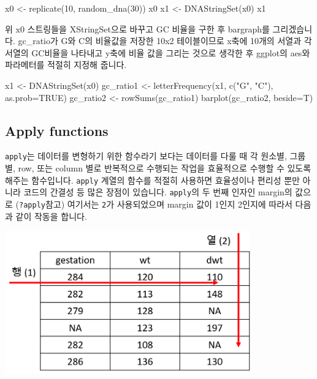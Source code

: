 \documentclass[
]{book}
\newenvironment{Shaded}{\begin{snugshade}}{\end{snugshade}}
\newcommand{\AttributeTok}[1]{\textcolor[rgb]{0.77,0.63,0.00}{#1}}
\newcommand{\ConstantTok}[1]{\textcolor[rgb]{0.00,0.00,0.00}{#1}}
\newcommand{\DecValTok}[1]{\textcolor[rgb]{0.00,0.00,0.81}{#1}}
\newcommand{\FunctionTok}[1]{\textcolor[rgb]{0.00,0.00,0.00}{#1}}
\newcommand{\NormalTok}[1]{#1}
\newcommand{\OtherTok}[1]{\textcolor[rgb]{0.56,0.35,0.01}{#1}}
\newcommand{\StringTok}[1]{\textcolor[rgb]{0.31,0.60,0.02}{#1}}
\begin{document}
\begin{Shaded}
\begin{Highlighting}[]
\NormalTok{x0 }\OtherTok{\textless{}{-}} \FunctionTok{replicate}\NormalTok{(}\DecValTok{10}\NormalTok{, }\FunctionTok{random\_dna}\NormalTok{(}\DecValTok{30}\NormalTok{))}
\NormalTok{x0}
\NormalTok{x1 }\OtherTok{\textless{}{-}} \FunctionTok{DNAStringSet}\NormalTok{(x0)}
\NormalTok{x1}
\end{Highlighting}
\end{Shaded}

위 x0 스트링들을 XStringSet으로 바꾸고 GC 비율을 구한 후 bargraph를 그리겠습니다. gc\_ratio가 G와 C의 비율값을 저장한 10x2 테이블이므로 x축에 10개의 서열과 각 서열의 GC비율을 나타내고 y축에 비율 값을 그리는 것으로 생각한 후 ggplot의 aes와 파라메터를 적절히 지정해 줍니다.

\begin{Shaded}
\begin{Highlighting}[]
\NormalTok{x1 }\OtherTok{\textless{}{-}} \FunctionTok{DNAStringSet}\NormalTok{(x0)}
\NormalTok{gc\_ratio1 }\OtherTok{\textless{}{-}} \FunctionTok{letterFrequency}\NormalTok{(x1, }\FunctionTok{c}\NormalTok{(}\StringTok{"G"}\NormalTok{, }\StringTok{"C"}\NormalTok{), }\AttributeTok{as.prob=}\ConstantTok{TRUE}\NormalTok{)}
\NormalTok{gc\_ratio2 }\OtherTok{\textless{}{-}} \FunctionTok{rowSums}\NormalTok{(gc\_ratio1)}
\FunctionTok{barplot}\NormalTok{(gc\_ratio2, }\AttributeTok{beside=}\NormalTok{T)}
\end{Highlighting}
\end{Shaded}

\hypertarget{apply-functions}{%
\subsection{Apply functions}\label{apply-functions}}

\texttt{apply}는 데이터를 변형하기 위한 함수라기 보다는 데이터를 다룰 때 각 원소별, 그룹별, row, 또는 column 별로 반복적으로 수행되는 작업을 효율적으로 수행할 수 있도록 해주는 함수입니다. \texttt{apply} 계열의 함수를 적절히 사용하면 효율성이나 편리성 뿐만 아니라 코드의 간결성 등 많은 장점이 있습니다. \texttt{apply}의 두 번째 인자인 margin의 값으로 (\texttt{?apply}참고) 여기서는 \texttt{2}가 사용되었으며 margin 값이 1인지 2인지에 따라서 다음과 같이 작동을 합니다.

\includegraphics[width=4.16667in,height=\textheight]{images/05/01.png}
\end{document}
